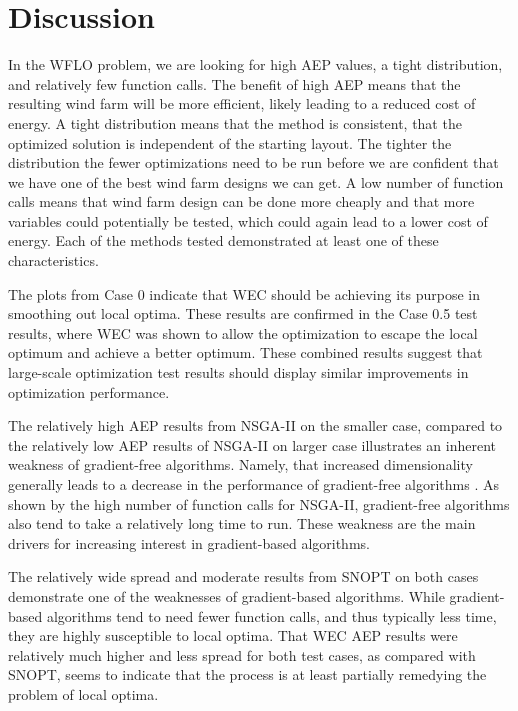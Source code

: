 \documentclass[a4paper]{jpconf}
\begin{document}
\section{Discussion}
In the WFLO problem, we are looking for high AEP values, a tight distribution, and relatively few function calls. The benefit of high AEP means that the resulting wind farm will be more efficient, likely leading to a reduced cost of energy. A tight distribution means that the method is consistent, that the optimized solution is independent of the starting layout. The tighter the distribution the fewer optimizations need to be run before we are confident that we have one of the best wind farm designs we can get. A low number of function calls means that wind farm design can be done more cheaply and that more variables could potentially be tested, which could again lead to a lower cost of energy. Each of the methods tested demonstrated at least one of these characteristics.

The plots from Case 0 indicate that WEC should be achieving its purpose in smoothing out local optima. These results are confirmed in the Case 0.5 test results, where WEC was shown to allow the optimization to escape the local optimum and achieve a better optimum. These combined results suggest that large-scale optimization test results should display similar improvements in optimization performance.

The relatively high AEP results from NSGA-II on the smaller case, compared to the relatively low AEP results of NSGA-II on larger case illustrates an inherent weakness of gradient-free algorithms. Namely, that increased dimensionality generally leads to a decrease in the performance of gradient-free algorithms \cite{rios2013-grad-free-comparison}. As shown by the high number of function calls for NSGA-II, gradient-free algorithms also tend to take a relatively long time to run. These weakness are the main drivers for increasing interest in gradient-based algorithms.

The relatively wide spread and moderate results from SNOPT on both cases demonstrate one of the weaknesses of gradient-based algorithms. While gradient-based algorithms tend to need fewer function calls, and thus typically less time, they are highly susceptible to local optima. That WEC AEP results were relatively much higher and less spread for both test cases, as compared with SNOPT, seems to indicate that the process is at least partially remedying the problem of local optima.
\end{document}
